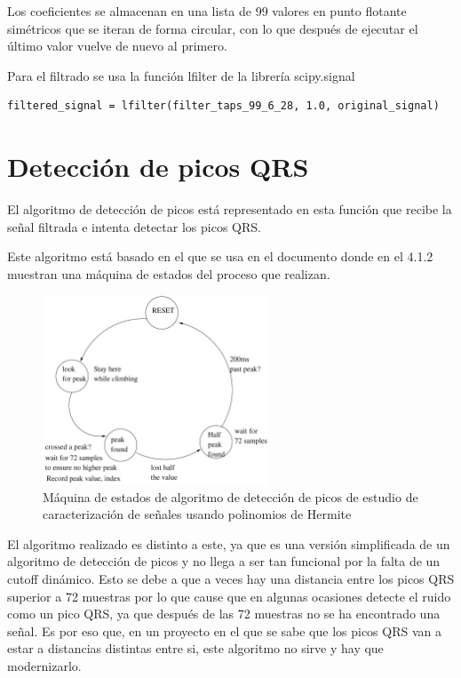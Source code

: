 Los coeficientes se almacenan en una lista de 99 valores en punto flotante simétricos que se iteran de forma 
circular, con lo que después de ejecutar el último valor vuelve de nuevo al primero.  

Para el filtrado se usa la función lfilter de la librería scipy.signal

\lstset{language=python, breaklines=true, basicstyle=\footnotesize}
\begin{lstlisting}[frame=single]
    filtered_signal = lfilter(filter_taps_99_6_28, 1.0, original_signal)
\end{lstlisting}

\section{Detección de picos QRS}

El algoritmo de detección de picos está representado en esta función que 
recibe la señal filtrada e intenta detectar los picos QRS.

Este algoritmo está basado en el que se usa en el documento \cite{desai2021low} 
donde en el 4.1.2 muestran una máquina de estados del proceso que realizan.

\begin{figure}[h!]
    \centering
    \includegraphics[width=0.6\textwidth]{./Images/img_algoritmo/fsm_mdpi.png}
    \caption{Máquina de estados de algoritmo de detección de picos de estudio de caracterización de señales usando polinomios de Hermite}
    \label{fig:fsm_mpdi}
\end{figure}

El algoritmo realizado es distinto a este, ya que es una versión simplificada de un algoritmo de detección de picos y no llega a ser tan 
funcional por la falta de un cutoff dinámico. Esto se debe a que a veces hay una distancia entre los picos QRS superior a 72 muestras 
por lo que cause que en algunas ocasiones detecte el ruido como un pico QRS, ya que después de las 72 muestras no se ha encontrado una señal.
Es por eso que, en un proyecto en el que se sabe que los picos QRS van a estar a distancias distintas entre si, este algoritmo no sirve y 
hay que modernizarlo.

